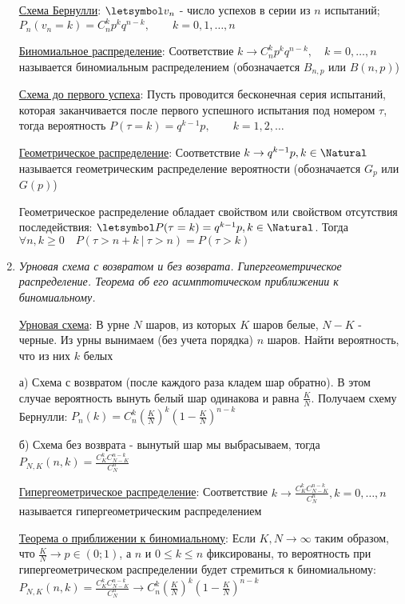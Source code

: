 \begin{enumerate}
    \hyperlink{bernoullischema2}{Схема Бернулли}: $\letsymbol v_n$ - число успехов в серии из $n$ испытаний; 
    $P_n(v_n = k) = C^k_n p^k q^{n - k}, \quad\quad k = 0, 1, \dots, n$

    \hyperlink{binomialdistribution}{Биномиальное распределение}: Соответствие $k \rightarrow C^k_n p^k q^{n - k}, \quad k = 0, \dots, n$ называется биномиальным распределением
    (обозначается $B_{n,p}$ или $B(n, p)$)

    \hyperlink{untilfirstsuccessschema}{Схема до первого успеха}: Пусть проводится бесконечная серия испытаний, которая заканчивается после первого успешного испытания
    под номером $\tau$, тогда вероятность $P(\tau = k) = q^{k - 1} p, \quad\quad k = 1, 2, \dots$

    \hyperlink{geometricdistribution}{Геометрическое распределение}: Соответствие $k \rightarrow q^{k - 1} p, k \in \Natural$ называется геометрическим
    распределение вероятности (обозначается $G_p$ или $G(p)$)

    Геометрическое распределение обладает свойством  или свойством отсутствия
    последействия: \Ths $\letsymbol P(\tau = k) = q^{k - 1} p, k \in \Natural$. Тогда $\forall n, k \geq 0 \quad P(\tau > n + k \ | \ \tau > n) = P(\tau > k)$

    \item \textit{Урновая схема с возвратом и без возврата. Гипергеометрическое распределение. Теорема об его асимптотическом приближении к биномиальному.}

    \hyperlink{urnschema}{Урновая схема}: В урне $N$ шаров, из которых $K$ шаров белые, $N - K$ - черные.
    Из урны вынимаем (без учета порядка) $n$ шаров. Найти вероятность, что из них $k$ белых

    а) Схема с возвратом (после каждого раза кладем шар обратно). В этом случае вероятность вынуть белый шар одинакова и
    равна $\frac{K}{N}$. Получаем схему Бернулли: $P_n(k) = C^k_n \left(\frac{K}{N}\right)^k \left(1 - \frac{K}{N}\right)^{n - k}$

    б) Схема без возврата - вынутый шар мы выбрасываем, тогда
    $P_{N, K} (n, k) = \frac{C^k_K C^{n - k}_{N - K}}{C^n_N}$

    \hyperlink{hypergeometricdistribution}{Гипергеометрическое распределение}: Соответствие $k \rightarrow \frac{C^k_K C^{n - k}_{N - K}}{C^n_N}, k = 0, \dots, n$ называется гипергеометрическим
    распределением

    \hyperlink{hypergeometricasimptotic}{Теорема о приближении к биномиальному}: \Ths Если $K, N \to \infty$ таким образом, что $\frac{K}{N} \to p \in (0;1)$, а $n$ и $0 \leq k \leq n$ фиксированы, то
    вероятность при гипергеометрическом распределении будет стремиться к биномиальному:
    $P_{N,K} (n, k) = \frac{C^k_K C^{n - k}_{N - K}}{C^n_N} \rightarrow C^k_n \left(\frac{K}{N}\right)^k \left(1 - \frac{K}{N}\right)^{n - k}$


\end{enumerate}
